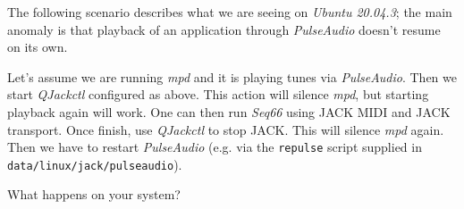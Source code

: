    The following scenario describes what we are seeing on
   \textsl{Ubuntu 20.04.3}; the main anomaly is that playback of
   an application through \textsl{PulseAudio} doesn't resume on its own.

   Let's assume we are running \textsl{mpd} and it is playing tunes via
   \textsl{PulseAudio}.
   Then we start \textsl{QJackctl} configured as above.
   This action will silence \textsl{mpd}, but starting playback again will
   work.
   One can then run \textsl{Seq66} using JACK MIDI and JACK transport.
   Once finish, use \textsl{QJackctl} to stop JACK.
   This will silence \textsl{mpd} again.
   Then we have to restart \textsl{PulseAudio} (e.g. via the
   \texttt{repulse} script supplied in \texttt{data/linux/jack/pulseaudio}).

   What happens on your system?


